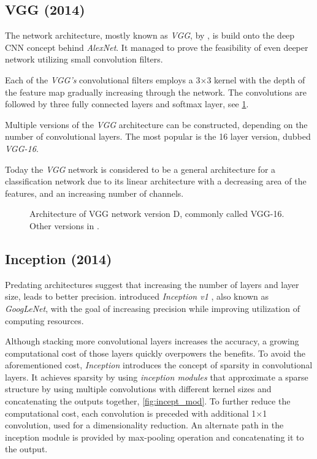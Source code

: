\subsection{VGG (2014)}
\label{sec:VGG}
The network architecture, mostly known as \textit{VGG}, by \citeauthor{bib:vgg} \cite{bib:vgg}, is build onto the deep CNN concept behind \textit{AlexNet}. It managed to prove the feasibility of even deeper network utilizing small convolution filters. 

Each of the \textit{VGG's} convolutional filters employs a 3$\times$3 kernel with the depth of the feature map gradually increasing through the network. The convolutions are followed by three fully connected layers and softmax layer, see \cref{tab:vggarch}. 

Multiple versions of the \textit{VGG} architecture can be constructed, depending on the number of convolutional layers. The most popular is the 16 layer version, dubbed \textit{VGG-16}.

Today the \textit{VGG} network is considered to be a general architecture for a classification network due to its linear architecture with a decreasing area of the features, and an increasing number of channels. 

\begin{figure}
    \centering
    \caption[VGG-16 architecture]%
    {Architecture of VGG network version D, commonly called VGG-16. Other versions in \cite[table 1]{bib:vgg}.}
    \label{tab:vggarch}
\end{figure}

\subsection{Inception (2014)}
\label{sec:inception}
Predating architectures suggest that increasing the number of layers and layer size, leads to better precision. \citeauthor{bib:googlenet} introduced \textit{Inception v1} \cite{bib:googlenet}, also known as \textit{GoogLeNet}, with the goal of increasing precision while improving utilization of computing resources.

Although stacking more convolutional layers increases the accuracy, a growing computational cost of those layers quickly overpowers the benefits. To avoid the aforementioned cost, \textit{Inception} introduces the concept of sparsity in convolutional layers. It achieves sparsity by using \textit{inception modules} that approximate a sparse structure by using multiple convolutions with different kernel sizes and concatenating the outputs together, \cref{fig:incept_mod}. To further reduce the computational cost, each convolution is preceded with additional 1$\times$1 convolution, used for a dimensionality reduction. An alternate path in the inception module is provided by max-pooling operation and concatenating it to the output.

